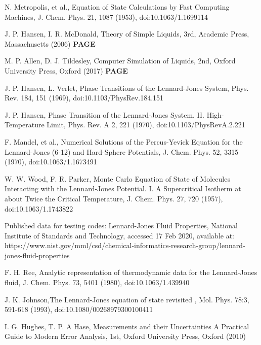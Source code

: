 \documentclass[10pt, twocolumn]{revtex4}    %
\begin{document}
\begin{thebibliography}{}




 N. Metropolis, et al., Equation of State Calculations by Fast Computing Machines, J. Chem. Phys. 21, 1087 (1953), doi:10.1063/1.1699114

 J. P. Hansen, I. R. McDonald, Theory of Simple Liquids, 3rd, Academic Press, Massachusetts (2006) \textbf{PAGE}

 M. P. Allen, D. J. Tildesley, Computer Simulation of Liquids, 2nd, Oxford University Press, Oxford (2017) \textbf{PAGE}

 J. P. Hansen, L. Verlet, Phase Transitions of the Lennard-Jones System, Phys. Rev. 184, 151 (1969), doi:10.1103/PhysRev.184.151

 J. P. Hansen, Phase Transition of the Lennard-Jones System. II. High-Temperature Limit, Phys. Rev. A 2, 221 (1970), doi:10.1103/PhysRevA.2.221

 F. Mandel, et al., Numerical Solutions of the Percus-Yevick Equation for the Lennard-Jones (6-12) and Hard-Sphere Potentials, J. Chem. Phys. 52, 3315 (1970), doi:10.1063/1.1673491

 W. W. Wood, F. R. Parker, Monte Carlo Equation of State of Molecules Interacting with the Lennard-Jones Potential. I. A Supercritical Isotherm at about Twice the Critical Temperature, J. Chem. Phys. 27, 720 (1957), doi:10.1063/1.1743822

 Published data for testing codes: Lennard-Jones Fluid Properties, National Institute of Standards and Technology, accessed 17 Feb 2020, available at: https://www.nist.gov/mml/csd/chemical-informatics-research-group/lennard-jones-fluid-properties

 F. H. Ree, Analytic representation of thermodynamic data for the
Lennard-Jones fluid, J. Chem. Phys. 73, 5401 (1980), doi:10.1063/1.439940

 J. K. Johnson,The Lennard-Jones equation of state revisited , Mol. Phys. 78:3, 591-618 (1993), doi:10.1080/00268979300100411

I. G. Hughes, T. P. A Hase, Measurements and their Uncertainties A Practical Guide to Modern Error Analysis, 1st, Oxford University Press, Oxford (2010)

\end{thebibliography} 
\end{document}
